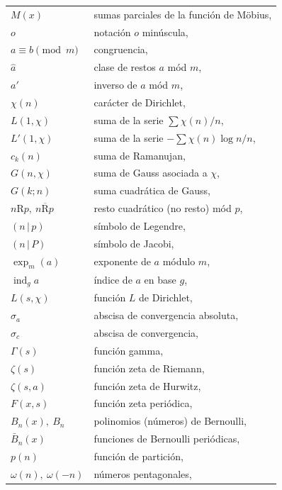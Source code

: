 \documentclass[12pt,a4paper]{book}
\begin{document}
\begin{longtable}{@{}p{}p{}@{}}
        $M(x)$ & sumas parciales de la función de Möbius, \pageref{sim:M}\\
        $o$ & notación $o$ minúscula, \pageref{sim:o}\\
        $a\equiv b\pmod{m}$ & congruencia, \pageref{sim:cong}\\
        $\hat{a}$ & clase de restos $a$ mód $m$, \pageref{sim:hat}\\
        $a'$ & inverso de $a$ mód $m$, \pageref{sim:ainv}\\
        $\chi(n)$ & carácter de Dirichlet, \pageref{sim:chi}\\
        $L(1,\chi)$ & suma de la serie $\sum\chi(n)/n$, \pageref{sim:L1}\\
        $L'(1,\chi)$ & suma de la serie $-\sum\chi(n)\log n/n$, \pageref{sim:L1p}\\
        $c_{k}(n)$ & suma de Ramanujan, \pageref{sim:ck}\\
        $G(n,\chi)$ & suma de Gauss asociada a $\chi$, \pageref{sim:G}\\
        $G(k;n)$ & suma cuadrática de Gauss, \pageref{sim:Gkn}\\
        $n\mathrm{R}p,\ n\overline{\mathrm{R}}p$ & resto cuadrático (no resto) mód $p$, \pageref{sim:nRp}\\
        $(n\,|\,p)$ & símbolo de Legendre, \pageref{sim:leg}\\
        $(n\,|\,P)$ & símbolo de Jacobi, \pageref{sim:jac}\\
        $\exp_{m}(a)$ & exponente de $a$ módulo $m$, \pageref{sim:exp}\\
        $\operatorname{ind}_{g} a$ & índice de $a$ en base $g$, \pageref{sim:ind}\\
        $L(s,\chi)$ & función $L$ de Dirichlet, \pageref{sim:Lsx}\\
        $\sigma_{a}$ & abscisa de convergencia absoluta, \pageref{sim:siga}\\
        $\sigma_{c}$ & abscisa de convergencia, \pageref{sim:sigc}\\
        $\Gamma(s)$ & función gamma, \pageref{sim:Gam}\\
        $\zeta(s)$ & función zeta de Riemann, \pageref{sim:zeta}\\
        $\zeta(s,a)$ & función zeta de Hurwitz, \pageref{sim:zsa}\\
        $F(x,s)$ & función zeta periódica, \pageref{sim:Fxs}\\
        $B_{n}(x),\ B_{n}$ & polinomios (números) de Bernoulli, \pageref{sim:Bn}\\
        $\bar{B}_{n}(x)$ & funciones de Bernoulli periódicas, \pageref{sim:Bbar}\\
        $p(n)$ & función de partición, \pageref{sim:pn}\\
        $\omega(n),\ \omega(-n)$ & números pentagonales, \pageref{sim:omn}\\
\end{longtable}

\cleardoublepage
{}
\printindex
\end{document}
